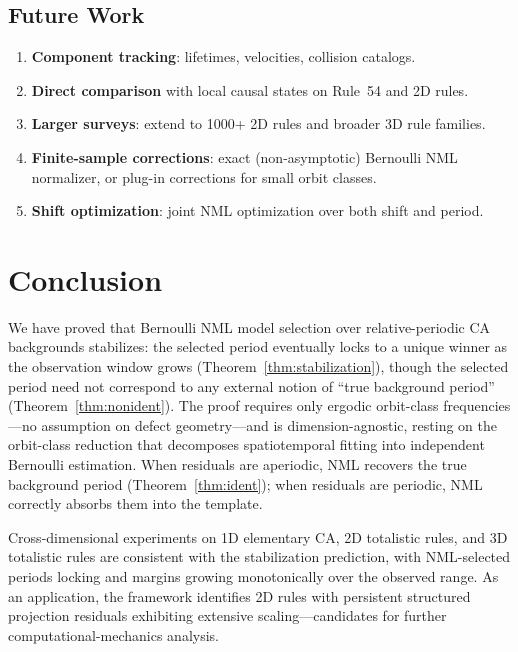 \documentclass[11pt]{article}
\theoremstyle{definition}
\theoremstyle{remark}
\begin{document}
\subsection{Future Work}

\begin{enumerate}
    \item \textbf{Component tracking}: lifetimes, velocities, collision catalogs.
    \item \textbf{Direct comparison} with local causal states \cite{rupe2018} on Rule~54 and 2D rules.
    \item \textbf{Larger surveys}: extend to 1000+ 2D rules and broader 3D rule families.
    \item \textbf{Finite-sample corrections}: exact (non-asymptotic) Bernoulli NML normalizer, or plug-in corrections for small orbit classes.
    \item \textbf{Shift optimization}: joint NML optimization over both shift and period.
\end{enumerate}

\section{Conclusion}

We have proved that Bernoulli NML model selection over relative-periodic CA backgrounds stabilizes: the selected period eventually locks to a unique winner as the observation window grows (Theorem~\ref{thm:stabilization}), though the selected period need not correspond to any external notion of ``true background period'' (Theorem~\ref{thm:nonident}).
The proof requires only ergodic orbit-class frequencies---no assumption on defect geometry---and is dimension-agnostic, resting on the orbit-class reduction that decomposes spatiotemporal fitting into independent Bernoulli estimation.
When residuals are aperiodic, NML recovers the true background period (Theorem~\ref{thm:ident}); when residuals are periodic, NML correctly absorbs them into the template.

Cross-dimensional experiments on 1D elementary CA, 2D totalistic rules, and 3D totalistic rules are consistent with the stabilization prediction, with NML-selected periods locking and margins growing monotonically over the observed range.
As an application, the framework identifies 2D rules with persistent structured projection residuals exhibiting extensive scaling---candidates for further computational-mechanics analysis.
\end{document}
